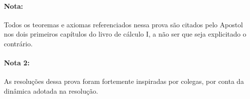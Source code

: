 \documentclass{IMTexam}
\author{Isabella B. Amaral}
\date{4 de novembro}
\begin{document}
	
	\maketitle
	
	\paragraph{Nota:} Todos os teoremas e axiomas referenciados nessa prova são citados pelo Apostol nos dois primeiros capítulos do livro de cálculo I, a não ser que seja explicitado o contrário.
	
	\paragraph{Nota 2:} As resoluções dessa prova foram fortemente inspiradas por colegas, por conta da dinâmica adotada na resolução.
	
\end{document}
